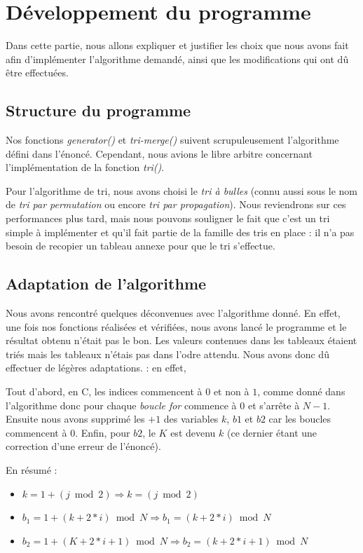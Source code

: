 \documentclass[12pt]{article}
\begin{document}
\section{Développement du programme}

Dans cette partie, nous allons expliquer et justifier les choix que nous avons
fait afin d'implémenter l'algorithme demandé, ainsi que les modifications qui
ont dû être effectuées.

\subsection{Structure du programme}

Nos fonctions \emph{generator()} et \emph{tri-merge()} suivent scrupuleusement
l'algorithme défini dans l'énoncé. Cependant, nous avions le libre arbitre
concernant l'implémentation de la fonction \emph{tri()}.
    
Pour l'algorithme de tri, nous avons choisi le \emph{tri à bulles} (connu aussi
sous le nom de \emph{tri par permutation} ou encore \emph{tri par propagation}).
Nous reviendrons sur ces performances plus tard, mais nous pouvons souligner le
fait que c'est un tri simple à implémenter et qu'il fait partie de la famille
des tris en place : il n'a pas besoin de recopier un tableau annexe pour que le
tri s'effectue. 

\subsection{Adaptation de l'algorithme}

Nous avons rencontré quelques déconvenues avec l'algorithme donné. En effet, une
fois nos fonctions réalisées et vérifiées, nous avons lancé le programme et le
résultat obtenu n'était pas le bon. Les valeurs contenues dans les tableaux
étaient triés mais les tableaux n'étais pas dans l'odre attendu. Nous avons donc
dû effectuer de légères adaptations. : en effet, 

Tout d'abord, en C, les indices commencent à $0$ et non à $1$, comme donné dans
l'algorithme donc pour chaque \emph{boucle for} commence à $0$ et s'arrête à 
$N-1$. Ensuite nous avons supprimé les $+1$ des variables $k$, $b1$ et $b2$ car 
les boucles commencent à 0. Enfin, pour $b2$, le $K$ est devenu $k$ (ce dernier
étant une correction d'une erreur de l'énoncé). 

En résumé :
\begin{itemize}
    \item $k = 1+(j\bmod 2) \Rightarrow k = (j\bmod 2)$
    \item $b_1 = 1+(k+2*i)\bmod N \Rightarrow b_1 = (k+2*i)\bmod N$
    \item $b_2 = 1+(K+2*i+1)\bmod N \Rightarrow b_2 = (k+2*i+1)\bmod N$
\end{itemize}
\end{document}
